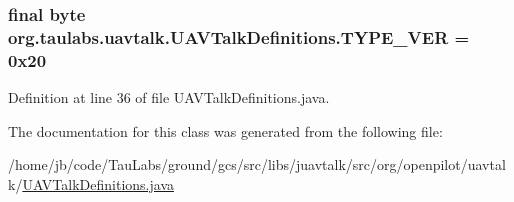 \hypertarget{classorg_1_1taulabs_1_1uavtalk_1_1_u_a_v_talk_definitions_af6183c1302cd3c3ea3e7a4bb929c73ea}{
\subsubsection[{\-T\-Y\-P\-E\-\_\-\-V\-E\-R}]{\setlength{\rightskip}{0pt plus 5cm}final byte {\bf org.\-taulabs.\-uavtalk.\-U\-A\-V\-Talk\-Definitions.\-T\-Y\-P\-E\-\_\-\-V\-E\-R} = 0x20}}\label{classorg_1_1taulabs_1_1uavtalk_1_1_u_a_v_talk_definitions_af6183c1302cd3c3ea3e7a4bb929c73ea}


\-Definition at line 36 of file \-U\-A\-V\-Talk\-Definitions.\-java.



\-The documentation for this class was generated from the following file\-:\begin{DoxyCompactItemize}
\item 
/home/jb/code/\-Tau\-Labs/ground/gcs/src/libs/juavtalk/src/org/openpilot/uavtalk/\hyperlink{_u_a_v_talk_definitions_8java}{\-U\-A\-V\-Talk\-Definitions.\-java}\end{DoxyCompactItemize}
